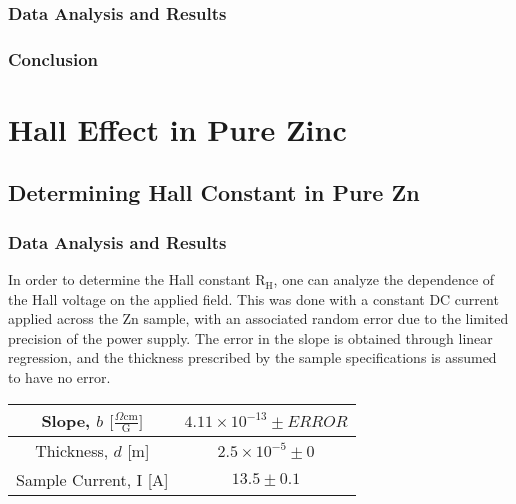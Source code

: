 \documentclass[a4paper]{article}
\begin{document}
\subsubsection{Data Analysis and Results}

\subsubsection{Conclusion}

\section{Hall Effect in Pure Zinc}

\subsection{Determining Hall Constant in Pure Zn}

\subsubsection{Data Analysis and Results}
In order to determine the Hall constant $\text{R}_\text{H}$, one can analyze the dependence of the Hall voltage on the applied field. This was done with a constant DC current applied across the Zn sample, with an associated random error due to the limited precision of the power supply. The error in the slope is obtained through linear regression, and the thickness prescribed by the sample specifications is assumed to have no error.

\begin{center}
\begin{tabular}{|c|c|}
\hline
Slope, $b$ $\big[  \frac{\Omega \text{cm}}{\text{G}} \big] $ & $4.11 \times 10^{-13} \pm ERROR$ \topVspace \bottomVspace \\
\hline
Thickness, $d$ [m] & $2.5 \times 10^{-5} \pm 0$ \topVspace \bottomVspace \\
\hline
Sample Current, I [A] & $13.5 \pm 0.1$ \topVspace \bottomVspace \\
\hline
\end{tabular}
\label{table:zinc_RH}
\end{center}
\end{document}
